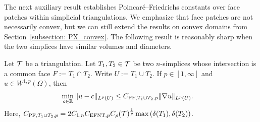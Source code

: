 \documentclass[10pt,a4paper]{article}
\begin{document}
The next auxiliary result establishes Poincar\'e--Friedrichs constants over face patches within simplicial triangulations. 
We emphasize that face patches are not necessarily convex, but we can still extend the results on convex domains from Section~\ref{subsection: PX_convex}. The following result is reasonably sharp when the two simplices have similar volumes and diameters.

\begin{lemma}\label{lemma:poincarefriedrichsoverfacepatch}
    Let ${\mathcal T}$ be a triangulation.
    Let $T_{1}, T_{2} \in {\mathcal T}$ be two $n$-simplices whose intersection is a common face $F := T_1 \cap T_2$. 
    Write $U := T_1 \cup T_2$. 
    If $p \in [1,\infty]$ and $u \in W^{1,p}(\Omega)$,
    then 
    \begin{align*}
        \min\limits_{ c \in {\mathbb R} }
        \| u - c \|_{L^{p}(U)}
        &
        \leq 
        C_{{{\rm PF}},T_1 \cup T_2,p}
        \| \nabla u \|_{L^{p}(U)}
        .
    \end{align*}
    Here, $C_{{{\rm PF}},T_1 \cup T_2,p} = 2 C_{1,n} C_{{\rm EFNT},p} C_\rho({\mathcal T})^{\frac 1 p} \max\left( {\delta}(T_1), {\delta}(T_2) \right)$. 
\end{lemma}
\end{document}
